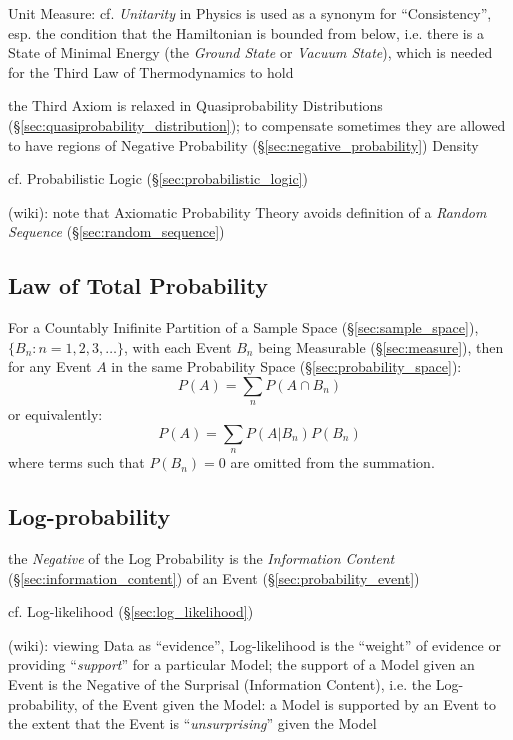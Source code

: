 \fist Unit Measure: cf. \emph{Unitarity} in Physics is used as a synonym for
``Consistency'', esp. the condition that the Hamiltonian is bounded from below,
i.e. there is a State of Minimal Energy (the \emph{Ground State} or
\emph{Vacuum State}), which is needed for the Third Law of Thermodynamics to
hold

the Third Axiom is relaxed in Quasiprobability Distributions
(\S\ref{sec:quasiprobability_distribution}); to compensate sometimes they are
allowed to have regions of Negative Probability
(\S\ref{sec:negative_probability}) Density

\fist cf. Probabilistic Logic (\S\ref{sec:probabilistic_logic})

(wiki): note that Axiomatic Probability Theory avoids definition of a
\emph{Random Sequence} (\S\ref{sec:random_sequence})



\subsection{Law of Total Probability}\label{sec:total_probability}

For a Countably Inifinite Partition of a Sample Space
(\S\ref{sec:sample_space}), $\{ B_n : n = 1,2,3,\ldots \}$, with each Event
$B_n$ being Measurable (\S\ref{sec:measure}), then for any Event $A$ in the same
Probability Space (\S\ref{sec:probability_space}):
\[
  P(A) = \sum_n P(A \cap B_n)
\]
or equivalently:
\[
  P(A) = \sum_n P(A|B_n) P(B_n)
\]
where terms such that $P(B_n) = 0$ are omitted from the summation.



\subsection{Log-probability}\label{sec:log_probability}

the \emph{Negative} of the Log Probability is the \emph{Information Content}
(\S\ref{sec:information_content}) of an Event (\S\ref{sec:probability_event})

cf. Log-likelihood (\S\ref{sec:log_likelihood})

(wiki): viewing Data as ``evidence'', Log-likelihood is the ``weight'' of
evidence or providing ``\emph{support}'' for a particular Model; the support of
a Model given an Event is the Negative of the Surprisal (Information Content),
i.e. the Log-probability, of the Event given the Model: a Model is supported by
an Event to the extent that the Event is ``\emph{unsurprising}'' given the Model



